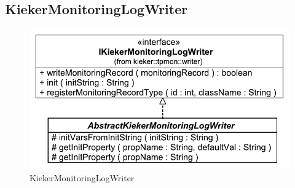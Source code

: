 \documentclass[12pt,journal,a4paper,twocolumn,final,oneside]{IEEEtran}%
\begin{document}
\subsection{KiekerMonitoringLogWriter}

\begin{figure}[h]\centering
\includegraphics[scale=0.55]{figures/model/kieker_KiekerMonitoringLogWriter}%
\caption{KiekerMonitoringLogWriter}
\end{figure}

\nocite{vanHoornRohrHasselbringWallerEhlersFreyKieselhorst2009TRContinuousMonitoringOfSoftwareServicesDesignAndApplicationOfTheKiekerFramework,RohrHoornMatevskaStoeverSommerGieseckeHasselbring2008KiekerContinuousMonitoringAndOnDemandVisualizationOfJavaSoftwareBehavior}

\end{document}
